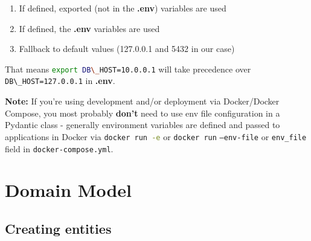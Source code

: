 \documentclass[14pt]{extarticle}
\newcommand{\note}{\textbf{\color{red}Note: }}
\newcommand{\bashinline}[1]{\lstinline[language=bash, style=cstyle, morekeywords={docker, poetry, git, mv, python, uvicorn}, basicstyle=\ttfamily\normalsize]{#1}}
\begin{document}
\begin{enumerate}
    \item If defined, exported (not in the \textbf{.env}) variables are used
    \item If defined, the \textbf{.env} variables are used
    \item Fallback to default values (127.0.0.1 and 5432 in our case)
\end{enumerate}

That means \bashinline{export DB\_HOST=10.0.0.1} will take precedence over \\\bashinline{DB\_HOST=127.0.0.1} in \textbf{.env}.

\note If you're using development and/or deployment via Docker/Docker Compose, you most probably \textbf{don't} need to use env file configuration in a Pydantic class - generally environment variables are defined and passed to applications in Docker via \bashinline{docker run -e} or \bashinline{docker run} \texttt{--env-file} or \texttt{env\_file} field in \texttt{docker-compose.yml}.

\section{Domain Model}

\subsection{Creating entities}
\end{document}
